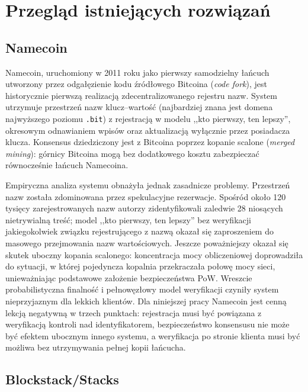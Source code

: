 \section{Przegląd istniejących rozwiązań}
\label{sec:przeglad-rozwiazan}

\subsection{Namecoin}
\label{subsec:namecoin}

Namecoin, uruchomiony w 2011 roku jako pierwszy samodzielny łańcuch utworzony przez odgałęzienie kodu źródłowego Bitcoina (\emph{code fork}), jest historycznie pierwszą realizacją zdecentralizowanego rejestru nazw. System utrzymuje przestrzeń nazw klucz--wartość (najbardziej znana jest domena najwyższego poziomu \texttt{.bit}) z rejestracją w modelu ,,kto pierwszy, ten lepszy'', okresowym odnawianiem wpisów oraz aktualizacją wyłącznie przez posiadacza klucza. Konsensus dziedziczony jest z Bitcoina poprzez kopanie scalone (\emph{merged mining}): górnicy Bitcoina mogą bez dodatkowego kosztu zabezpieczać równocześnie łańcuch Namecoina.

Empiryczna analiza systemu \cite{kalodner2015namecoin} obnażyła jednak zasadnicze problemy. Przestrzeń nazw została zdominowana przez spekulacyjne rezerwacje. Spośród około 120 tysięcy zarejestrowanych nazw autorzy zidentyfikowali zaledwie 28 niosących nietrywialną treść; model ,,kto pierwszy, ten lepszy'' bez weryfikacji jakiegokolwiek związku rejestrującego z nazwą okazał się zaproszeniem do masowego przejmowania nazw wartościowych. Jeszcze poważniejszy okazał się skutek uboczny kopania scalonego: koncentracja mocy obliczeniowej doprowadziła do sytuacji, w której pojedyncza kopalnia przekraczała połowę mocy sieci, unieważniając podstawowe założenie bezpieczeństwa PoW. Wreszcie probabilistyczna finalność i pełnowęzłowy model weryfikacji czyniły system nieprzyjaznym dla lekkich klientów. Dla niniejszej pracy Namecoin jest cenną lekcją negatywną w trzech punktach: rejestracja musi być powiązana z weryfikacją kontroli nad identyfikatorem, bezpieczeństwo konsensusu nie może być efektem ubocznym innego systemu, a weryfikacja po stronie klienta musi być możliwa bez utrzymywania pełnej kopii łańcucha.

\subsection{Blockstack/Stacks}
\label{subsec:blockstack}

